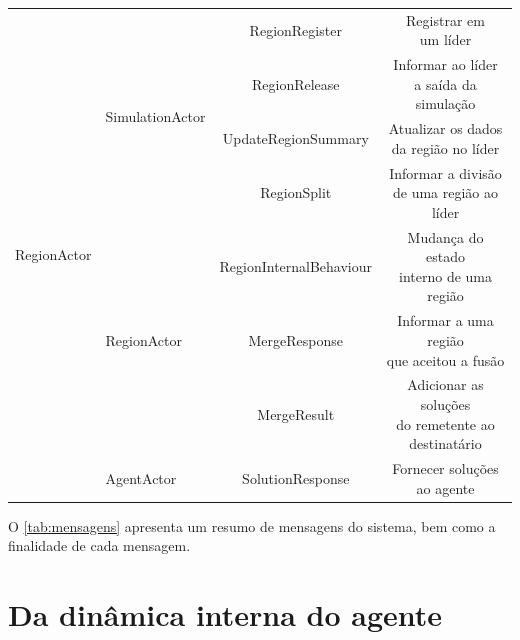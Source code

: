 \begin{quadro}[ht!]
\begin{tabular}{llcc}
\midrule
\multirow{8}{*}{RegionActor}        & \multirow{4}{*}{SimulationActor}      & RegionRegister            & \makecell{Registrar em\\um líder} \\
\cmidrule{3-4}
                                    &                                       & RegionRelease             & \makecell{Informar ao líder\\a saída da simulação} \\
\cmidrule{3-4}
                                    &                                       & UpdateRegionSummary       & \makecell{Atualizar os dados\\da região no líder} \\
\cmidrule{3-4}
                                    &                                       & RegionSplit               & \makecell{Informar a divisão\\de uma região ao líder} \\
\cmidrule{2-4}
                                    & \multirow{3}{*}{RegionActor}          & RegionInternalBehaviour   & \makecell{Mudança do estado\\interno de uma região} \\
\cmidrule{3-4}
                                    &                                       & MergeResponse             & \makecell{Informar a uma região\\que aceitou a fusão} \\
\cmidrule{3-4}
                                    &                                       & MergeResult               & \makecell{Adicionar as soluções\\do remetente ao\\destinatário} \\
\cmidrule{2-4}
                                    & AgentActor                            & SolutionResponse          & \makecell{Fornecer soluções\\ao agente} \\
\bottomrule
\end{tabular}

\end{quadro}

O \autoref{tab:mensagens} apresenta um resumo de mensagens do sistema, bem como a finalidade de cada mensagem. 

\section{Da dinâmica interna do agente}

